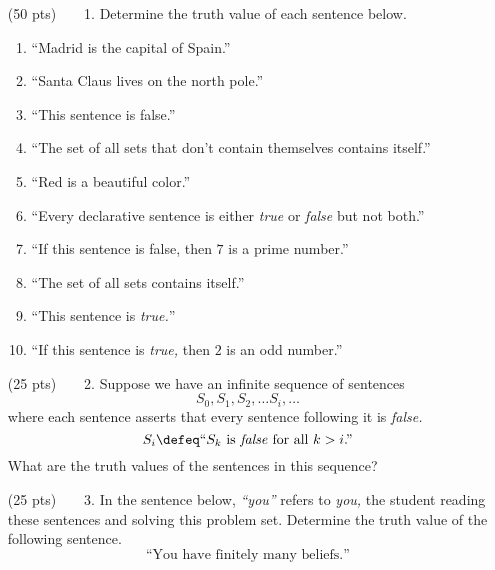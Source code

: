 \begin{enumerate}
  \item[(50 pts)~~~~1.]
    Determine the truth value of each sentence below.
    \begin{enumerate}
      \item
        ``Madrid is the capital of Spain.''
      \item
        ``Santa Claus lives on the north pole.''
      \item
        ``This sentence is false.''
      \item
        ``The set of all sets that don't contain themselves contains itself.''%
      \item
        ``Red is a beautiful color.''
      \item
        ``Every declarative sentence is either \emph{true} or \emph{false} but not both.''
      \item
        ``If this sentence is false, then $7$ is a prime number.''%
      \item
        ``The set of all sets contains itself.''
      \item
        ``This sentence is \emph{true.}''
      \item
        ``If this sentence is \emph{true,} then $2$ is an odd number.''%
    \end{enumerate}

  \item[(25 pts)~~~~2.]
    Suppose we have an infinite sequence of sentences
    \begin{equation*}
      S_0, S_1, S_2, \dots S_i, \dots
    \end{equation*}
    where each sentence asserts that every sentence following it is \emph{false.}
    \begin{equation*}
      S_i \defeq \text{``}S_k \text{ is \emph{false} for all } k > i\text{.''}
    \end{equation*}
    What%
    are the truth values of the sentences in this sequence?

  \item[(25 pts)~~~~3.]
    In the sentence below, \emph{``you''} refers to \emph{you}\emph{,} the student reading these sentences and solving this problem set.
    Determine the truth value of the following sentence.
    \begin{equation*}
      \text{``You have finitely many beliefs.''}
    \end{equation*}
\end{enumerate}


